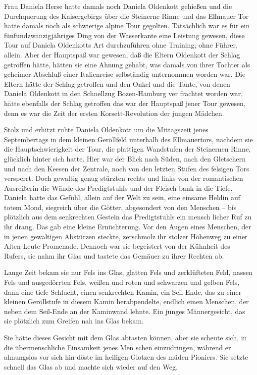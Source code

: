 Frau Daniela Herse hatte damals noch Daniela Oldenkott
gehießen und die Durchquerung des Kaisergebirgs über die
Steinerne Rinne und das Ellmauer Tor hatte damals noch
als schwierige alpine Tour gegolten. Tatsächlich war es für
ein fünfundzwanzigjähriges Ding von der Wasserkante eine
Leistung gewesen, diese Tour auf Daniela Oldenkotts Art
durchzuführen\dopp{} ohne Training, ohne Führer, allein. Aber der
Hauptspaß war gewesen, daß die Eltern Oldenkott der Schlag
getroffen hätte, hätten sie eine Ahnung gehabt, was damals
von ihrer Tochter als geheimer Abschluß einer Italienreise
selbständig unternommen worden war. Die Eltern hätte der
Schlag getroffen und den Onkel und die Tante, von denen
Daniela Oldenkott in den Schnellzug Bozen-Hamburg ver\-%
frachtet worden war, hätte ebenfalls der Schlag getroffen\dopp{}
das war der Hauptspaß jener Tour gewesen, denn es war die
Zeit der ersten Korsett-Revolution der jungen Mädchen.

Stolz und erhitzt ruhte Daniela Oldenkott um die Mittagszeit
jenes Septembertags in dem kleinen Geröllfeld unterhalb
des Ellmauertors, nachdem sie die Hauptschwierigkeit der
Tour, die plattigen Wandstufen der Steinernen Rinne,
glücklich hinter sich hatte. Hier war der Blick nach Süden,
nach den Gletschern und nach den Keesen der Zentrale,
noch von den letzten Stufen des felsigen Tors versperrt. Doch
gewaltig genug stürzten rechts und links von der romantischen
Ausreißerin die Wände des Predigtstuhls und der Fleisch\-%
bank in die Tiefe. Daniela hatte das Gefühl, allein auf der
Welt zu sein, eine einsame Heldin auf totem Mond, siegreich
über die Götter, abgesondert von den Menschen -- bis plötzlich
aus dem senkrechten Gestein das Predigtstuhls ein mensch\-%
licher Ruf zu ihr drang. Das gab eine kleine Ernüchterung.
Vor den Augen eines Menschen, der in jenen gewaltigen
Abstürzen steckte, zerschmolz ihr stolzer Höhenweg zu einer
Alten-Leute-Promenade. Dennoch war sie begeistert von der
Kühnheit des Rufers, sie nahm ihr Glas und tastete das
Gemäuer zu ihrer Rechten ab.

Lange Zeit bekam sie nur Fels ins Glas, glatten Fels und
zerklüfteten Feld, nassen Fels und ausgedörrten Fels, weißen
und roten und schwarzen und gelben Fels, dann eine tiefe
Schlucht, einen senkrechten Kamin, ein Seil-Ende, das zu
einer kleinen Geröllstufe in diesem Kamin herabpendelte,
endlich einen Menschen, der neben dem Seil-Ende an der
Kaminwand lehnte. Ein junges Männergesicht, das sie plötzlich
zum Greifen nah ins Glas bekam.

Sie hätte dieses Gesicht mit dem Glas abtasten können, aber
sie scheute sich, in die übermenschliche Einsamkeit jenes Men\-%
schen einzudringen, während er ahnungslos vor sich hin döste
im heiligen Glotzen des müden Pioniers. Sie setzte schnell das
Glas ab und machte sich wieder auf den Weg.

